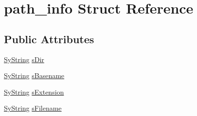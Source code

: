 \hypertarget{structpath__info}{\section{path\-\_\-info Struct Reference}
\label{d3/d46/structpath__info}
}
\subsection*{Public Attributes}
\begin{DoxyCompactItemize}
\item 
\hyperlink{struct_sy_string}{Sy\-String} \hyperlink{structpath__info_aea865c2965bdfd0fe686550074bcf8cf}{s\-Dir}
\item 
\hyperlink{struct_sy_string}{Sy\-String} \hyperlink{structpath__info_aa69edee8fe617238ae6cc09a1137e516}{s\-Basename}
\item 
\hyperlink{struct_sy_string}{Sy\-String} \hyperlink{structpath__info_a341842278bfb23bfd8edce7cc208a988}{s\-Extension}
\item 
\hyperlink{struct_sy_string}{Sy\-String} \hyperlink{structpath__info_ae495b29fdcfd0b9ff97f011d7cfb0bef}{s\-Filename}
\end{DoxyCompactItemize}


